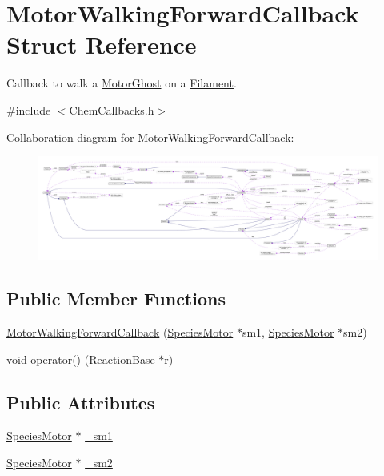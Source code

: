\hypertarget{structMotorWalkingForwardCallback}{\section{Motor\+Walking\+Forward\+Callback Struct Reference}
\label{structMotorWalkingForwardCallback}
}


Callback to walk a \hyperlink{classMotorGhost}{Motor\+Ghost} on a \hyperlink{classFilament}{Filament}.  




{\ttfamily \#include $<$Chem\+Callbacks.\+h$>$}



Collaboration diagram for Motor\+Walking\+Forward\+Callback\+:
\nopagebreak
\begin{figure}[H]
\begin{center}
\leavevmode
\includegraphics[width=350pt]{structMotorWalkingForwardCallback__coll__graph}
\end{center}
\end{figure}
\subsection*{Public Member Functions}
\begin{DoxyCompactItemize}
\item 
\hyperlink{structMotorWalkingForwardCallback_a9d977663ec46a938ca8de651afb7115e}{Motor\+Walking\+Forward\+Callback} (\hyperlink{classSpeciesMotor}{Species\+Motor} $\ast$sm1, \hyperlink{classSpeciesMotor}{Species\+Motor} $\ast$sm2)
\item 
void \hyperlink{structMotorWalkingForwardCallback_af140a2c836e0e5e96fb9196a47ca8e95}{operator()} (\hyperlink{classReactionBase}{Reaction\+Base} $\ast$r)
\end{DoxyCompactItemize}
\subsection*{Public Attributes}
\begin{DoxyCompactItemize}
\item 
\hyperlink{classSpeciesMotor}{Species\+Motor} $\ast$ \hyperlink{structMotorWalkingForwardCallback_abd0c24b9f2cda56144f9fec0421e3c42}{\+\_\+sm1}
\item 
\hyperlink{classSpeciesMotor}{Species\+Motor} $\ast$ \hyperlink{structMotorWalkingForwardCallback_a1c1d1deb98e90fd90f57791705152873}{\+\_\+sm2}
\end{DoxyCompactItemize}


